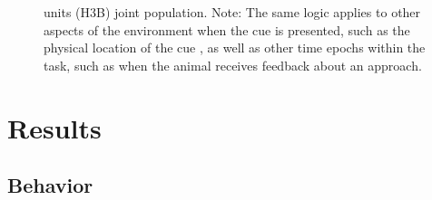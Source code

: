 \documentclass[11pt]{article}
\providecommand{\DIFadd}[1]{{\protect\color{red} \sf #1}} %
\providecommand{\DIFdel}[1]{} %
\providecommand{\DIFaddFL}[1]{\DIFadd{#1}} %
\providecommand{\DIFdelFL}[1]{\DIFdel{#1}} %
\providecommand{\DIFaddbeginFL}{} %
\providecommand{\DIFaddendFL}{} %
\providecommand{\DIFdelbeginFL}{} %
\providecommand{\DIFdelendFL}{} %
\newcommand{\DIFscaledelfig}{0.5}
\newlength{\DIFdelgraphicswidth} %
\newlength{\DIFdelgraphicsheight} %
\newcommand{\DIFaddincludegraphics}[2][]{{\color{red}\fbox{\DIFOincludegraphics[#1]{#2}}}} %
\newcommand{\DIFdelincludegraphics}[2][]{%
\sbox{\DIFdelgraphicsbox}{\DIFOincludegraphics[#1]{#2}}%
\settoboxwidth{\DIFdelgraphicswidth}{\DIFdelgraphicsbox} %
\settoboxtotalheight{\DIFdelgraphicsheight}{\DIFdelgraphicsbox} %
\scalebox{\DIFscaledelfig}{%
\parbox[b]{\DIFdelgraphicswidth}{\usebox{\DIFdelgraphicsbox}\\[-\baselineskip] \rule{\DIFdelgraphicswidth}{0em}}\llap{\resizebox{\DIFdelgraphicswidth}{\DIFdelgraphicsheight}{%
\setlength{\unitlength}{\DIFdelgraphicswidth}%
\begin{picture}(1,1)%
\thicklines\linethickness{2pt} %
{\color[rgb]{1,0,0}\put(0,0){\framebox(1,1){}}}%
{\color[rgb]{1,0,0}\put(0,0){\line( 1,1){1}}}%
{\color[rgb]{1,0,0}\put(0,1){\line(1,-1){1}}}%
\end{picture}%
}\hspace*{3pt}}} %
} %
\DeclareRobustCommand{\DIFaddbeginFL}{\DIFOaddbeginFL \let\includegraphics\DIFaddincludegraphics} %
\DeclareRobustCommand{\DIFaddendFL}{\DIFOaddendFL \let\includegraphics\DIFOincludegraphics} %
\DeclareRobustCommand{\DIFdelbeginFL}{\DIFOdelbeginFL \let\includegraphics\DIFdelincludegraphics} %
\DeclareRobustCommand{\DIFdelendFL}{\DIFOaddendFL \let\includegraphics\DIFOincludegraphics} %
\begin{document}
\begin{figure}[ht!]
{{units (H3B)}\DIFdelendFL \DIFaddbeginFL \DIFaddFL{joint population}\DIFaddendFL . \DIFaddbeginFL \DIFaddFL{Note: }\DIFaddendFL The same \DIFdelbeginFL \DIFdelFL{hypotheses apply }\DIFdelendFL \DIFaddbeginFL \DIFaddFL{logic applies }\DIFaddendFL to other \DIFdelbeginFL \DIFdelFL{information-containing }\DIFdelendFL aspects of the environment when the cue is presented, such as the physical location of the cue\DIFaddbeginFL \DIFaddFL{, as well as other time epochs within the task, such as when the animal receives feedback about an approach}\DIFaddendFL .}
\label{fig:schematic}
\end{figure} \clearpage

\section*{Results}

\subsection*{Behavior}
\end{document}

